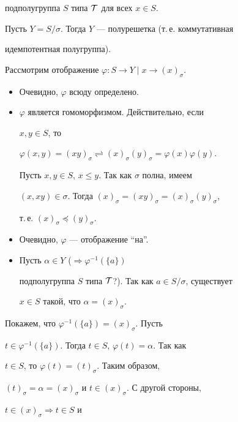 подполугруппа $S$ типа $\cal T$ для всех $x\in S$. 


 


Пусть $Y=S/\sigma$. Тогда $Y$ --- полурешетка (т.\,е. коммутативная 


идемпотентная полугруппа). 


 


Рассмотрим отображение $\varphi:S\to Y\mid x\to(x)_\sigma$. 


\begin{itemize} 


\item[$\alpha)$] Очевидно, $\varphi$ всюду определено. 


\item[$\beta)$] $\varphi$ является гомоморфизмом. Действительно, если 


$x,y\in S$, то 


$\varphi(x,y)=(xy)_\sigma\rightleftharpoons(x)_\sigma(y)_\sigma= 


\varphi(x)\varphi(y)$. 


Пусть $x,y\in S$, $x\le y$. Так как $\sigma$ полна, имеем 


$(x,xy)\in\sigma$. Тогда $(x)_\sigma=(xy)_\sigma=(x)_\sigma(y)_\sigma$, 


т.\,е. $(x)_\sigma\preceq(y)_\sigma$. 


\item[$\gamma)$] Очевидно, $\varphi$ --- отображение ``на''. 


\item[$\delta)$] Пусть $\alpha\in Y$ ($\Rightarrow\varphi^{-1}(\{a\})$ 


подполугруппа $S$ типа $\cal T$?). Так как $a\in S/\sigma$, существует 


$x\in S$ такой, что $\alpha=(x)_\sigma$. 


\end{itemize} 


 


Покажем, что $\varphi^{-1}(\{a\})=(x)_\sigma$. Пусть 


$t\in\varphi^{-1}(\{a\})$. Тогда $t\in S$, $\varphi(t)=\alpha$. Так как 


$t\in S$, то $\varphi(t)=(t)_\sigma$. Таким образом, 


$(t)_\sigma=\alpha=(x)_\sigma$ и $t\in(x)_\sigma$. С другой стороны, 


$t\in(x)_\sigma\Rightarrow t\in S$ и 


